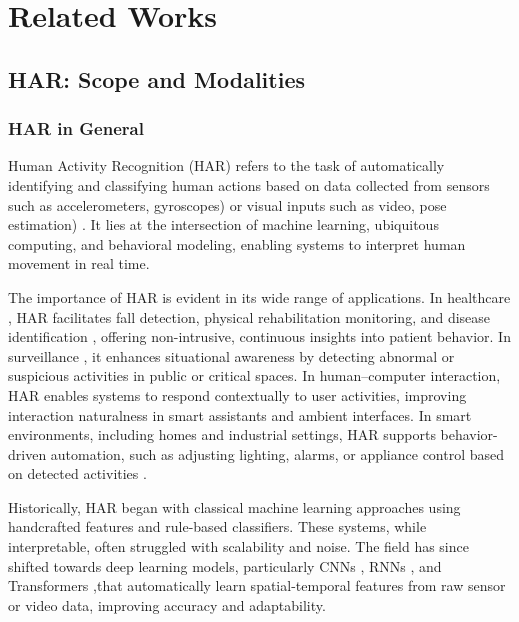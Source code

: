 \chapter{Related Works}
\label{chap:relatedwork}
{\renewcommand{\thefootnote}{}}

\section{HAR: Scope and Modalities}
\label{sec:HARScope}

\subsection{HAR in General}

Human Activity Recognition (HAR) refers to the task of automatically identifying and classifying human actions based on data collected from sensors such as accelerometers, gyroscopes) \cite{ramanujam2021human} or visual inputs such as video, pose estimation) \cite{pareek2021survey}. It lies at the intersection of machine learning, ubiquitous computing, and behavioral modeling, enabling systems to interpret human movement in real time.

The importance of HAR is evident in its wide range of applications. In healthcare \cite{bibbo2023human}, HAR facilitates fall detection, physical rehabilitation monitoring, and disease identification \cite{zaher2025unlocking}, offering non-intrusive, continuous insights into patient behavior. In surveillance \cite{waghchaware2024machine}, it enhances situational awareness by detecting abnormal or suspicious activities in public or critical spaces. In human–computer interaction, HAR enables systems to respond contextually to user activities, improving interaction naturalness in smart assistants and ambient interfaces. In smart environments, including homes and industrial settings, HAR supports behavior-driven automation, such as adjusting lighting, alarms, or appliance control based on detected activities \cite{qureshi2025systematic}.

Historically, HAR began with classical machine learning approaches using handcrafted features and rule-based classifiers. These systems, while interpretable, often struggled with scalability and noise. The field has since shifted towards deep learning models, particularly CNNs \cite{yi2023human}, RNNs \cite{sherstinsky2020fundamentals}, and Transformers \cite{han2021transformer},that automatically learn spatial-temporal features from raw sensor or video data, improving accuracy and adaptability.

